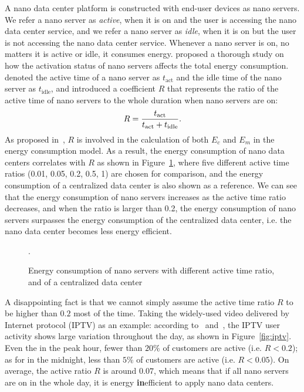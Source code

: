 A nano data center platform is constructed with end-user devices as nano servers.
We refer a nano server as \textit{active}, when it is on and the user is accessing the nano data center service,
and we refer a nano server as \textit{idle}, when it is on but the user is not accessing the nano data center service.
Whenever a nano server is on,
no matters it is active or idle,
it consumes energy.
\cite{DBLP:conf/conext/ValanciusLMDR09} proposed a thorough study on how the activation status of nano servers affects the total energy consumption.
\cite{DBLP:conf/conext/ValanciusLMDR09} denoted the active time of a nano server as $t_\text{act}$ and the idle time of the nano server as $t_\text{idle}$,
and introduced a coefficient $R$ that represents the ratio of the active time of nano servers to the whole duration when nano servers are on:
\begin{equation}
R=\frac{t_\text{act}}{t_\text{act}+t_\text{idle}}.\\
\end{equation}
As proposed in~\cite{DBLP:conf/conext/ValanciusLMDR09}, 
$R$ is involved in the calculation of both $E_c$ and $E_m$ in the energy consumption model.
As a result,
the energy consumption of nano data centers correlates with $R$ as shown in Figure~\ref{fig:active},
where five different active time ratios (0.01, 0.05, 0.2, 0.5, 1) are chosen for comparison,	
and the energy consumption of a centralized data center is also shown as a reference.
We can see that the energy consumption of nano servers increases as the active time ratio decreases,
and when the ratio is larger than 0.2, the energy consumption of nano servers surpasses the energy consumption of the centralized data center,
i.e. the nano data center becomes less energy efficient.

\begin{figure}[h]
	\fontsize{12}{12} \selectfont
	\centerline{\resizebox{5cm}{!}{}}
	\caption{Energy consumption of nano servers with different active time ratio, and of a centralized data center~\cite{DBLP:conf/conext/ValanciusLMDR09}}.
	\label{fig:active}
	\normalsize
\end{figure}

A disappointing fact is that we cannot simply assume the active time ratio $R$ to be higher than $0.2$ most of the time.
Taking the widely-used video delivered by Internet protocol (IPTV)  as an example:
according to~\cite{DBLP:conf/conext/ValanciusLMDR09} and~\cite{watchingTV},
the IPTV user activity shows large variation throughout the day,
as shown in Figure~\ref{fig:iptv}.
Even the in the peak hour,
fewer than $20\%$ of customers are active (i.e. $R<0.2$);
as for in the midnight,
less than $5\%$ of customers are active (i.e. $R<0.05$).
On average,
the active ratio $R$ is around $0.07$,
which means that if all nano servers are on in the whole day,
it is energy \textbf{in}efficient to apply nano data centers.

